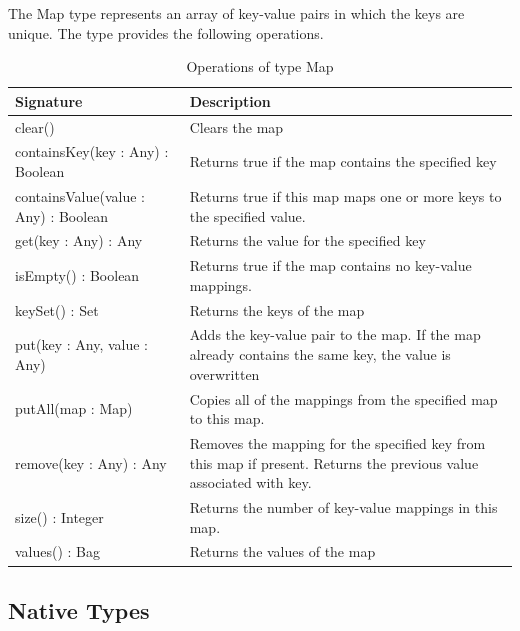 The Map type represents an array of key-value pairs in which the keys are unique. The type provides the following operations.

\begin{longtabu} {|p{6.5cm}|X|}
\caption{Operations of type Map}
\label{tab:MapOperations}\\
\hline

    \textbf{Signature} & \textbf{Description} \\\hline

    clear() & Clears the map\\\hline
    
    containsKey(key : Any) : Boolean & Returns true if the map contains the specified key\\\hline
    
    containsValue(value : Any) : Boolean &  Returns true if this map maps one or more keys to the specified value.\\\hline
    
    get(key : Any) : Any & Returns the value for the specified key\\\hline

    isEmpty() : Boolean & Returns true if the map contains no key-value mappings.\\\hline
    
    keySet() : Set & Returns the keys of the map\\\hline
    
    put(key : Any, value : Any) & Adds the key-value pair to the map. If the map already contains the same key, the value is overwritten\\\hline
    
    putAll(map : Map) & Copies all of the mappings from the specified map to this map.\\\hline
    
    remove(key : Any) : Any & Removes the mapping for the specified key from this map if present. Returns the previous value associated with key.\\\hline
    
    size() : Integer &  Returns the number of key-value mappings in this map.\\\hline
    
    values() : Bag & Returns the values of the map\\\hline
\end{longtabu}

\subsection{Native Types}

